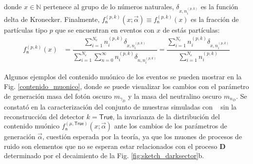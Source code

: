 donde $x\in\mathbb{N}$ pertenece al grupo de lo números naturales, $\delta_{x,n_i^{(p,k)}}$ es la función delta de Kronecker. %
Finalmente, $f^{(p, k)}_\textsf{n} (x; \vec{\alpha}) \equiv f^{(p, k)}_\textsf{n} (x)$ es la fracción de partículas tipo $p$ que se encuentran en eventos con $x$ de estás partículas:
\begin{eqnarray}\label{fn}
f^{(p, k)}_\textsf{n} (x) & = \dfrac{\sum\limits_{i=1}^{N_e} n_i^{(p,k)} \delta_{x,n_i^{(p,k)}}}{\sum\limits_{i=1}^{N_e} \sum\limits_{n=0}^\infty n_i^{(p,k)} \delta_{n, n_i^{(p,k)}}}  = \dfrac{\sum\limits_{i=1}^{N_e} n_i^{(p,k)} \delta_{x, n_i^{(p,k)}}}{\sum\limits_{i=1}^{N_e} n_i^{(p,k)}}
\end{eqnarray}


Algunos ejemplos del contenido muónico de los eventos se pueden mostrar en la Fig. \ref{contenido_muonico}, donde se puede visualizar los cambios con el parámetro de generación masa del fotón oscuro $m_{\gamma_D}$ y la masa del neutralino oscuro $m_{n_D}$. Se constató en la caracterización del conjunto de muestras simuladas con \MC ~ sin la reconstrucción del detector $k=\textsf{True}$, la invarianza de la distribución del contenido muónico $f^{(\mu, \textsf{True})}_\textsf{n} (x; \vec{\alpha}) $ ante los cambios de los parámetros de generación $\vec{\alpha}$, cuestión esperada por la teoría, ya que los muones de procesos de ruido son elementos que no se esperan estar relacionados con el proceso \MSSM\textbf{D} ~ determinado por el decaimiento de la Fig. \ref{fig:sketch_darksector}b.

